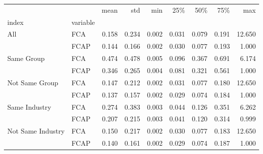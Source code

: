 \begin{tabular}{llrrrrrrr}
\toprule
                  &      &   mean &    std &    min &    25\% &    50\% &    75\% &     max \\
index & variable &        &        &        &        &        &        &         \\
\midrule
All & FCA &  0.158 &  0.234 &  0.002 &  0.031 &  0.079 &  0.191 &  12.650 \\
                  & FCAP &  0.144 &  0.166 &  0.002 &  0.030 &  0.077 &  0.193 &   1.000 \\
Same Group & FCA &  0.474 &  0.478 &  0.005 &  0.096 &  0.367 &  0.691 &   6.174 \\
                  & FCAP &  0.346 &  0.265 &  0.004 &  0.081 &  0.321 &  0.561 &   1.000 \\
Not Same Group & FCA &  0.147 &  0.212 &  0.002 &  0.031 &  0.077 &  0.180 &  12.650 \\
                  & FCAP &  0.137 &  0.157 &  0.002 &  0.029 &  0.074 &  0.184 &   1.000 \\
Same Industry & FCA &  0.274 &  0.383 &  0.003 &  0.044 &  0.126 &  0.351 &   6.262 \\
                  & FCAP &  0.207 &  0.215 &  0.003 &  0.041 &  0.120 &  0.314 &   0.999 \\
Not Same Industry & FCA &  0.150 &  0.217 &  0.002 &  0.030 &  0.077 &  0.183 &  12.650 \\
                  & FCAP &  0.140 &  0.161 &  0.002 &  0.029 &  0.074 &  0.187 &   1.000 \\
\bottomrule
\end{tabular}
